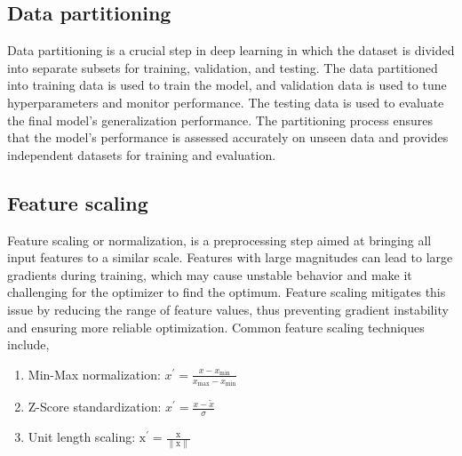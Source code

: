 \subsection{Data partitioning}Data partitioning is a crucial step in deep learning in which the dataset is divided into separate subsets for training, validation, and testing. The data partitioned into training data is used to train the model, and validation data is used to tune hyperparameters and monitor performance. The testing data is used to evaluate the final model's generalization performance. The partitioning process ensures that the model's performance is assessed accurately on unseen data and provides independent datasets for training and evaluation. 
\subsection{Feature scaling}Feature scaling or normalization, is a preprocessing step aimed at bringing all input features to a similar scale. Features with large magnitudes can lead to large gradients during training, which may cause unstable behavior and make it challenging for the optimizer to find the optimum. Feature scaling mitigates this issue by reducing the range of feature values, thus preventing gradient instability and ensuring more reliable optimization. Common feature scaling techniques include,
\begin{enumerate}
\item Min-Max normalization: $x^{\prime}=\frac{x-x_{\min }}{x_{\max }-x_{\min }}$
\item Z-Score standardization: $x^{\prime}=\frac{x-\tilde{x}}{\sigma}$
\item Unit length scaling: $\mathrm{x}^{\prime}=\frac{\mathrm{x}}{\|\mathrm{x}\|}$
\end{enumerate}
